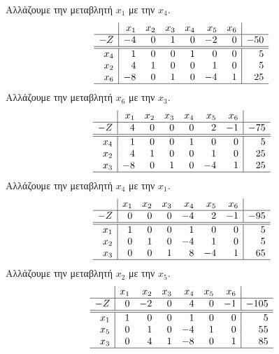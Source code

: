 \documentclass[12pt]{report}
\begin{document}
Αλλάζουμε την μεταβλητή $x_1$ με την $x_4$.
$$
    \begin{array}{r|rrrrrr|r}
            & x_1 & x_2 & x_3 & x_4 & x_5 & x_6 &     \\ \hline
        -Z  & -4  & 0   & 1   & 0   & -2  & 0   & -50 \\ \hline\hline
        x_4 & 1   & 0   & 0   & 1   & 0   & 0   & 5   \\
        x_2 & 4   & 1   & 0   & 0   & 1   & 0   & 5   \\
        x_6 & -8  & 0   & 1   & 0   & -4  & 1   & 25  \\ \hline
    \end{array}
$$
Αλλάζουμε την μεταβλητή $x_6$ με την $x_3$.
$$
    \begin{array}{r|rrrrrr|r}
            & x_1 & x_2 & x_3 & x_4 & x_5 & x_6 &     \\ \hline
        -Z  & 4   & 0   & 0   & 0   & 2   & -1  & -75 \\ \hline\hline
        x_4 & 1   & 0   & 0   & 1   & 0   & 0   & 5   \\
        x_2 & 4   & 1   & 0   & 0   & 1   & 0   & 25  \\
        x_3 & -8  & 0   & 1   & 0   & -4  & 1   & 25  \\ \hline
    \end{array}
$$
Αλλάζουμε την μεταβλητή $x_4$ με την $x_1$.
$$
    \begin{array}{r|rrrrrr|r}
            & x_1 & x_2 & x_3 & x_4 & x_5 & x_6 &     \\ \hline
        -Z  & 0   & 0   & 0   & -4  & 2   & -1  & -95 \\ \hline\hline
        x_1 & 1   & 0   & 0   & 1   & 0   & 0   & 5   \\
        x_2 & 0   & 1   & 0   & -4  & 1   & 0   & 5   \\
        x_3 & 0   & 0   & 1   & 8   & -4  & 1   & 65  \\ \hline
    \end{array}
$$
Αλλάζουμε την μεταβλητή $x_2$ με την $x_5$.
$$
    \begin{array}{r|rrrrrr|r}
            & x_1 & x_2 & x_3 & x_4 & x_5 & x_6 &      \\ \hline
        -Z  & 0   & -2  & 0   & 4   & 0   & -1  & -105 \\ \hline\hline
        x_1 & 1   & 0   & 0   & 1   & 0   & 0   & 5    \\
        x_5 & 0   & 1   & 0   & -4  & 1   & 0   & 55   \\
        x_3 & 0   & 4   & 1   & -8  & 0   & 1   & 85   \\ \hline
    \end{array}
$$
\end{document}
